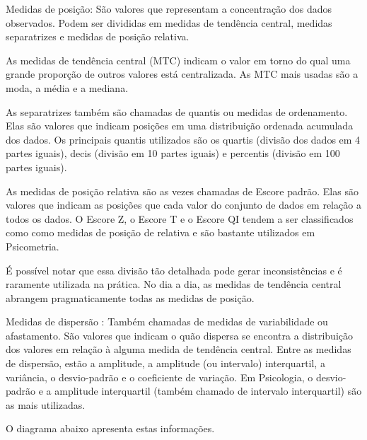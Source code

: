 \documentclass[
]{book}
\begin{document}
Medidas de posição: São valores que representam a concentração dos dados observados. Podem ser divididas em medidas de tendência central, medidas separatrizes e medidas de posição relativa.

As medidas de tendência central (MTC) indicam o valor em torno do qual uma grande proporção de outros valores está centralizada. As MTC mais usadas são a moda, a média e a mediana.

As separatrizes também são chamadas de quantis ou medidas de ordenamento. Elas são valores que indicam posições em uma distribuição ordenada acumulada dos dados. Os principais quantis utilizados são os quartis (divisão dos dados em 4 partes iguais), decis (divisão em 10 partes iguais) e percentis (divisão em 100 partes iguais).

As medidas de posição relativa são as vezes chamadas de Escore padrão. Elas são valores que indicam as posições que cada valor do conjunto de dados em relação a todos os dados. O Escore Z, o Escore T e o Escore QI tendem a ser classificados como como medidas de posição de relativa e são bastante utilizados em Psicometria.

É possível notar que essa divisão tão detalhada pode gerar inconsistências e é raramente utilizada na prática. No dia a dia, as medidas de tendência central abrangem pragmaticamente todas as medidas de posição.

Medidas de dispersão : Também chamadas de medidas de variabilidade ou afastamento. São valores que indicam o quão dispersa se encontra a distribuição dos valores em relação à alguma medida de tendência central. Entre as medidas de dispersão, estão a amplitude, a amplitude (ou intervalo) interquartil, a variância, o desvio-padrão e o coeficiente de variação. Em Psicologia, o desvio-padrão e a amplitude interquartil (também chamado de intervalo interquartil) são as mais utilizadas.

O diagrama abaixo apresenta estas informações.
\end{document}
